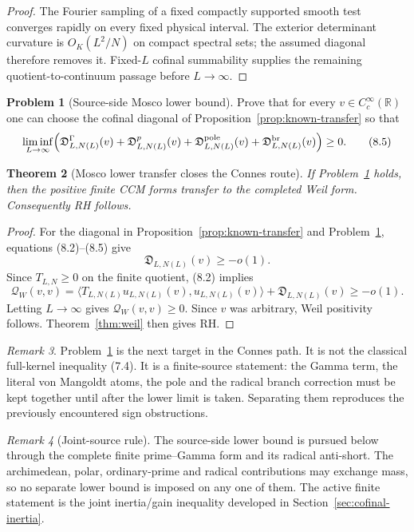 \documentclass[11pt]{amsart}
\newtheorem{theorem}{Theorem}[section]
\theoremstyle{definition}
\newtheorem{problem}[theorem]{Problem}
\theoremstyle{remark}
\newtheorem{remark}[theorem]{Remark}
\newcommand{\R}{\mathbb R}
\newcommand{\QW}{\mathcal Q_W}
\begin{document}
\begin{proof}
The Fourier sampling of a fixed compactly supported smooth test converges
rapidly on every fixed physical interval.  The exterior determinant
curvature is \(O_K(L^2/N)\) on compact spectral sets; the assumed diagonal
therefore removes it.  Fixed-\(L\) cofinal summability supplies the
remaining quotient-to-continuum passage before \(L\to\infty\).
\end{proof}

\begin{problem}[Source-side Mosco lower bound]
\label{prob:source-mosco}
Prove that for every \(v\in C_c^\infty(\R)\) one can choose the cofinal
diagonal of Proposition~\ref{prop:known-transfer} so that
\[
 \liminf_{L\to\infty}
 \Bigl(
 \mathfrak D^{\Gamma}_{L,N(L)}(v)
 +\mathfrak D^{p}_{L,N(L)}(v)
 +\mathfrak D^{\rm pole}_{L,N(L)}(v)
 +\mathfrak D^{\rm br}_{L,N(L)}(v)
 \Bigr)
 \ge0 .
\tag{8.5}
\]
\end{problem}

\begin{theorem}[Mosco lower transfer closes the Connes route]
\label{thm:mosco-transfer}
If Problem~\ref{prob:source-mosco} holds, then the positive finite CCM
forms transfer to the completed Weil form.  Consequently RH follows.
\end{theorem}

\begin{proof}
For the diagonal in Proposition~\ref{prop:known-transfer} and
Problem~\ref{prob:source-mosco}, equations (8.2)--(8.5) give
\[
 \mathfrak D_{L,N(L)}(v)\ge-o(1).
\tag{8.6}
\]
Since \(T_{L,N}\ge0\) on the finite quotient, (8.2) implies
\[
 \QW(v,v)
 =
 \langle T_{L,N(L)}u_{L,N(L)}(v),u_{L,N(L)}(v)\rangle
 +\mathfrak D_{L,N(L)}(v)
 \ge-o(1).
\tag{8.7}
\]
Letting \(L\to\infty\) gives \(\QW(v,v)\ge0\).  Since \(v\) was
arbitrary, Weil positivity follows.  Theorem~\ref{thm:weil} then gives
RH.
\end{proof}

\begin{remark}
Problem~\ref{prob:source-mosco} is the next target in the Connes path.  It
is not the classical full-kernel inequality (7.4).  It is a finite-source
statement: the Gamma term, the literal von Mangoldt atoms, the pole and the
radical branch correction must be kept together until after the lower
limit is taken.  Separating them reproduces the previously encountered
sign obstructions.
\end{remark}

\begin{remark}[Joint-source rule]
The source-side lower bound is pursued below through the complete finite
prime--Gamma form and its radical anti-short.  The archimedean, polar,
ordinary-prime and radical contributions may exchange mass, so no
separate lower bound is imposed on any one of them.  The active finite
statement is the joint inertia/gain inequality developed in
Section~\ref{sec:cofinal-inertia}.
\end{remark}
\end{document}
